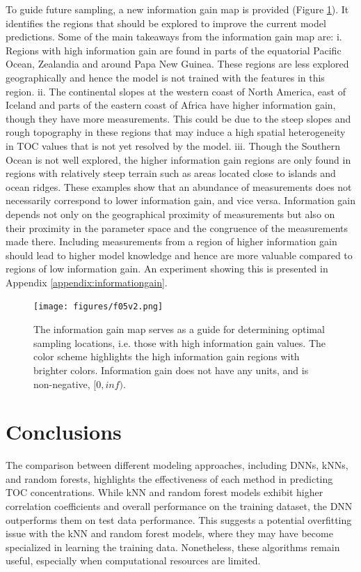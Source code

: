 \documentclass[journal abbreviation, manuscript]{copernicus}
\begin{document}
To guide future sampling, a new information gain map is provided (Figure \ref{fig:informationgain}). It identifies the regions that should be explored to improve the current model predictions. Some of the main takeaways from the information gain map are: i. Regions with high information gain are found in parts of the equatorial Pacific Ocean, Zealandia and around Papa New Guinea. These regions are less explored geographically and hence the model is not trained with the features in this region. ii. The continental slopes at the western coast of North America, east of Iceland and parts of the eastern coast of Africa have higher information gain, though they have more measurements. This could be due to the steep slopes and rough topography in these regions that may induce a high spatial heterogeneity in TOC values that is not yet resolved by the model. iii. Though the Southern Ocean is not well explored, the higher information gain regions are only found in regions with relatively steep terrain such as areas located close to islands and ocean ridges. These examples show that an abundance of measurements does not necessarily correspond to lower information gain, and vice versa. Information gain depends not only on the geographical proximity of measurements but also on their proximity in the parameter space and the congruence of the measurements made there. Including measurements from a region of higher information gain should lead to higher model knowledge and hence are more valuable compared to regions of low information gain. An experiment showing this is presented in Appendix \ref{appendix:informationgain}.


\begin{figure}
    \centering
    \texttt{[image: figures/f05v2.png]}
    \caption{The information gain map serves as a guide for determining optimal sampling locations, i.e. those with high information gain values. The color scheme highlights the high information gain regions with brighter colors. Information gain does not have any units, and is non-negative, $[0, inf)$.}
    \label{fig:informationgain}
\end{figure}



\section{Conclusions}  %
The comparison between different modeling approaches, including DNNs, kNNs, and random forests, highlights the effectiveness of each method in predicting TOC concentrations. While kNN and random forest models exhibit higher correlation coefficients and overall performance on the training dataset, the DNN outperforms them on test data performance. This suggests a potential overfitting issue with the kNN and random forest models, where they may have become specialized in learning the training data. Nonetheless, these algorithms remain useful, especially when computational resources are limited.
\end{document}
